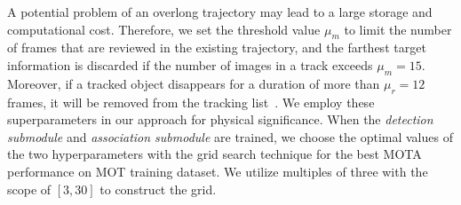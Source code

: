 \documentclass[acmsmall]{acmart}
\begin{document}
{
A potential problem of an overlong trajectory may lead to a large storage and computational cost. 
Therefore, we set the threshold value $\mu_m$ to limit the number of frames that are reviewed in the existing trajectory, 
and the farthest target information is discarded if the number of images in a track exceeds $\mu_m=15$. 
Moreover, if a tracked object disappears for a duration of more than $\mu_r=12$ frames, it will be removed from the tracking list~\cite{train_mot}. 
We employ these superparameters in our approach for physical significance. 
When the \emph{detection submodule} and \emph{association submodule} are trained,
we choose the optimal values of the two hyperparameters with the grid search technique for the best MOTA performance on MOT training dataset.
We utilize multiples of three with the scope of $[3, 30]$ to construct the grid. 
}
\end{document}
